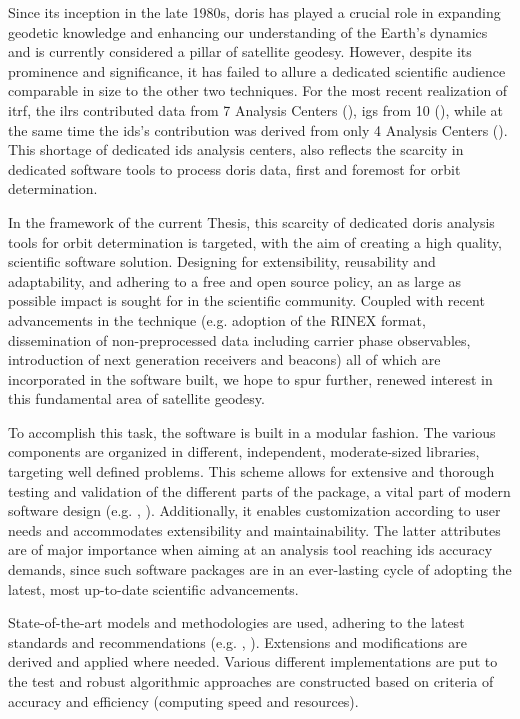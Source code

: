 Since its inception in the late 1980s, \gls{doris} has  played a crucial role in expanding
geodetic knowledge and enhancing our understanding of the Earth’s dynamics and is currently
considered a pillar of satellite geodesy. However, despite its prominence and significance,
it has failed to allure a dedicated scientific audience comparable in size to the other two
techniques. For the most recent realization of \gls{itrf}, the \gls{ilrs} contributed data
from 7 Analysis Centers (\cite{Pavlis2023}), \gls{igs} from 10 (\cite{Rebischung2021}), while
at the same time the \gls{ids}'s contribution was derived from only 4 Analysis Centers
(\cite{Moreaux2022}). This shortage of dedicated \gls{ids} analysis centers, also reflects the
scarcity in dedicated software tools to process \gls{doris} data, first and foremost for
orbit determination.

In the framework of the current Thesis, this scarcity of dedicated \gls{doris}
analysis tools for orbit determination is targeted, with the aim of creating
a high quality, scientific software solution. Designing for extensibility, reusability
and adaptability, and adhering to a free and open source policy, an as large as possible
impact is sought for in the scientific community. Coupled with recent
advancements in the technique (e.g. adoption of the RINEX format, dissemination of
non-preprocessed data including carrier phase observables, introduction of next generation
receivers and beacons) all of which are incorporated in the software built, 
we hope to spur further, renewed interest in this fundamental area of satellite geodesy.

To accomplish this task, the software is built in a modular fashion. The various components
are organized in different, independent, moderate-sized libraries, targeting well defined
problems. This scheme allows for extensive and thorough testing and validation  of the different 
parts of the package, a vital part of modern software design (e.g. \cite{Oberkampf2010}, \cite{Meyer2008}).
Additionally, it enables customization according to user needs and accommodates  
extensibility and maintainability. The latter attributes are of major importance when 
aiming at an analysis tool reaching \gls{ids} accuracy demands, since such software packages 
are in an ever-lasting cycle of adopting the latest, most up-to-date scientific advancements.

State-of-the-art models and methodologies are used, adhering to the latest 
standards and recommendations (e.g. \cite{IdsRecommendationItrf2020}, \cite{iers2010}). 
Extensions and modifications are derived and applied where needed. Various different 
implementations are put to the test and robust algorithmic approaches are constructed 
based on criteria of accuracy and efficiency (computing speed and resources).

